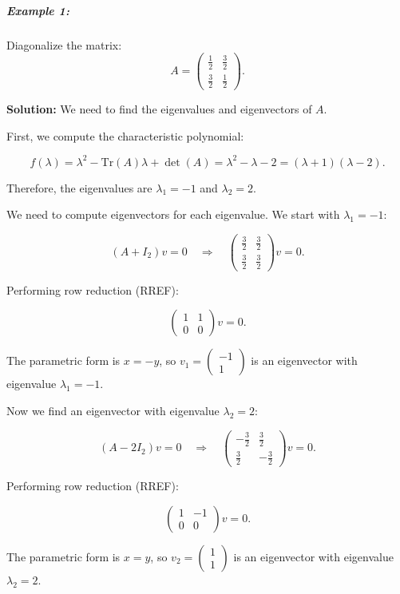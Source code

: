 \documentclass[a4paper,12pt]{article}
\begin{document}
\subparagraph{Example 1:}Diagonalize the matrix:
\[
A = \begin{pmatrix}
\frac{1}{2} & \frac{3}{2} \\
\frac{3}{2} & \frac{1}{2}
\end{pmatrix}.
\]

\textbf{Solution:} We need to find the eigenvalues and eigenvectors of \(A\).

First, we compute the characteristic polynomial:

\[
f(\lambda) = \lambda^2 - \text{Tr}(A) \lambda + \det(A) = \lambda^2 - \lambda - 2 = (\lambda + 1)(\lambda - 2).
\]

Therefore, the eigenvalues are \( \lambda_1 = -1 \) and \( \lambda_2 = 2 \).

We need to compute eigenvectors for each eigenvalue. We start with \( \lambda_1 = -1 \):

\[
(A + I_2) v = 0 \quad \Rightarrow \quad \begin{pmatrix} \frac{3}{2} & \frac{3}{2} \\ \frac{3}{2} & \frac{3}{2} \end{pmatrix} v = 0.
\]

Performing row reduction (RREF):

\[
\begin{pmatrix} 1 & 1 \\ 0 & 0 \end{pmatrix} v = 0.
\]

The parametric form is \( x = -y \), so \( v_1 = \begin{pmatrix} -1 \\ 1 \end{pmatrix} \) is an eigenvector with eigenvalue \( \lambda_1 = -1 \).

Now we find an eigenvector with eigenvalue \( \lambda_2 = 2 \):

\[
(A - 2I_2) v = 0 \quad \Rightarrow \quad \begin{pmatrix} -\frac{3}{2} & \frac{3}{2} \\ \frac{3}{2} & -\frac{3}{2} \end{pmatrix} v = 0.
\]

Performing row reduction (RREF):

\[
\begin{pmatrix} 1 & -1 \\ 0 & 0 \end{pmatrix} v = 0.
\]

The parametric form is \( x = y \), so \( v_2 = \begin{pmatrix} 1 \\ 1 \end{pmatrix} \) is an eigenvector with eigenvalue \( \lambda_2 = 2 \).
\end{document}
